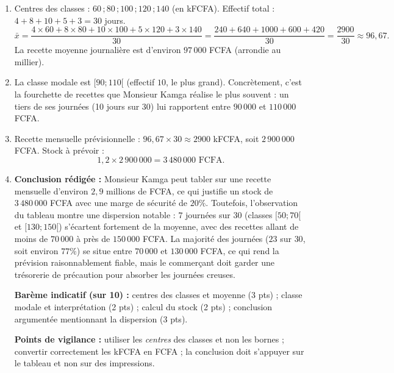 \documentclass[11pt]{article}
\begin{document}
\begin{corrige}
\begin{enumerate}
    \item Centres des classes : $60\,; 80\,; 100\,; 120\,; 140$ (en kFCFA). Effectif total : $4 + 8 + 10 + 5 + 3 = 30$ jours.
    \[ \bar{x} = \dfrac{4 \times 60 + 8 \times 80 + 10 \times 100 + 5 \times 120 + 3 \times 140}{30} = \dfrac{240 + 640 + 1000 + 600 + 420}{30} = \dfrac{2900}{30} \approx 96,67. \]
    La recette moyenne journalière est d'environ $97\,000$ FCFA (arrondie au millier).
    \item La classe modale est $[90 ; 110[$ (effectif $10$, le plus grand). Concrètement, c'est la fourchette de recettes que Monsieur Kamga réalise le plus souvent : un tiers de ses journées (10 jours sur 30) lui rapportent entre $90\,000$ et $110\,000$ FCFA.
    \item Recette mensuelle prévisionnelle : $96,67 \times 30 \approx 2900$ kFCFA, soit $2\,900\,000$ FCFA. Stock à prévoir :
    \[ 1,2 \times 2\,900\,000 = 3\,480\,000 \text{ FCFA}. \]
    \item \textbf{Conclusion rédigée :} Monsieur Kamga peut tabler sur une recette mensuelle d'environ $2,9$ millions de FCFA, ce qui justifie un stock de $3\,480\,000$ FCFA avec une marge de sécurité de $20\%$. Toutefois, l'observation du tableau montre une dispersion notable : $7$ journées sur $30$ (classes $[50;70[$ et $[130;150[$) s'écartent fortement de la moyenne, avec des recettes allant de moins de $70\,000$ à près de $150\,000$ FCFA. La majorité des journées ($23$ sur $30$, soit environ $77\%$) se situe entre $70\,000$ et $130\,000$ FCFA, ce qui rend la prévision raisonnablement fiable, mais le commerçant doit garder une trésorerie de précaution pour absorber les journées creuses.
    
    \textbf{Barème indicatif (sur 10) :} centres des classes et moyenne (3 pts) ; classe modale et interprétation (2 pts) ; calcul du stock (2 pts) ; conclusion argumentée mentionnant la dispersion (3 pts).
    
    \textbf{Points de vigilance :} utiliser les \emph{centres} des classes et non les bornes ; convertir correctement les kFCFA en FCFA ; la conclusion doit s'appuyer sur le tableau et non sur des impressions.
\end{enumerate}
\end{corrige}
\end{document}
